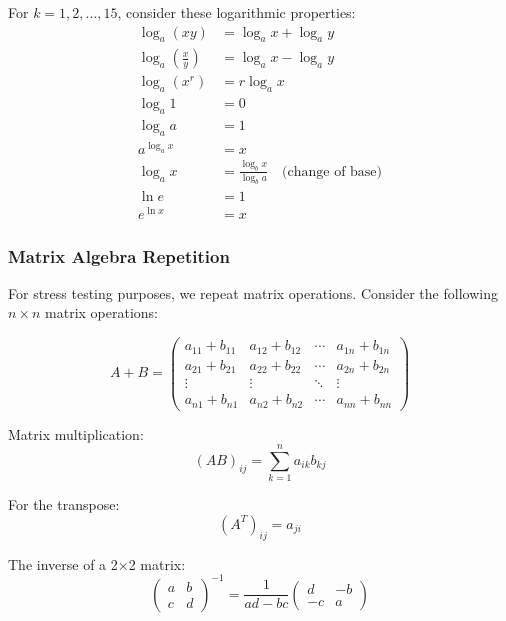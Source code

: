 \documentclass[12pt]{article}
\begin{document}
For $k = 1, 2, \ldots, 15$, consider these logarithmic properties:
\begin{align}
\log_a(xy) &= \log_a x + \log_a y \\
\log_a\left(\frac{x}{y}\right) &= \log_a x - \log_a y \\
\log_a(x^r) &= r \log_a x \\
\log_a 1 &= 0 \\
\log_a a &= 1 \\
a^{\log_a x} &= x \\
\log_a x &= \frac{\log_b x}{\log_b a} \quad \text{(change of base)} \\
\ln e &= 1 \\
e^{\ln x} &= x
\end{align}

\subsubsection{Matrix Algebra Repetition}

For stress testing purposes, we repeat matrix operations. Consider the following $n \times n$ matrix operations:

\begin{equation}
A + B = \begin{pmatrix}
a_{11} + b_{11} & a_{12} + b_{12} & \cdots & a_{1n} + b_{1n} \\
a_{21} + b_{21} & a_{22} + b_{22} & \cdots & a_{2n} + b_{2n} \\
\vdots & \vdots & \ddots & \vdots \\
a_{n1} + b_{n1} & a_{n2} + b_{n2} & \cdots & a_{nn} + b_{nn}
\end{pmatrix}
\end{equation}

Matrix multiplication:
\begin{equation}
(AB)_{ij} = \sum_{k=1}^{n} a_{ik} b_{kj}
\end{equation}

For the transpose:
\begin{equation}
(A^T)_{ij} = a_{ji}
\end{equation}

The inverse of a 2×2 matrix:
\begin{equation}
\begin{pmatrix} a & b \\ c & d \end{pmatrix}^{-1} = \frac{1}{ad - bc} \begin{pmatrix} d & -b \\ -c & a \end{pmatrix}
\end{equation}
\end{document}
